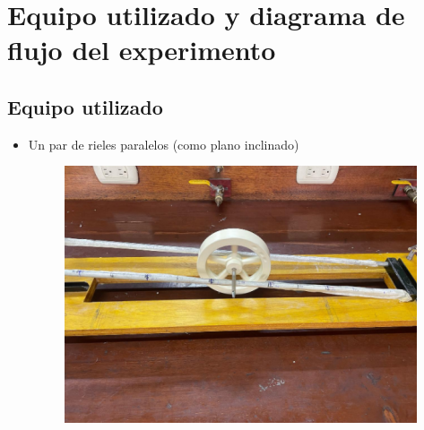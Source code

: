 \documentclass[10pt]{article}
\begin{document}
\section{Equipo utilizado y diagrama de flujo del experimento}
\subsection{Equipo utilizado}
\begin{itemize}
  \item Un par de rieles paralelos (como plano inclinado)
\begin{figure}[H]
    \centering
\includegraphics[scale = 0.40, center]{rieles}
\end{figure}
          

\end{itemize}
\end{document}
